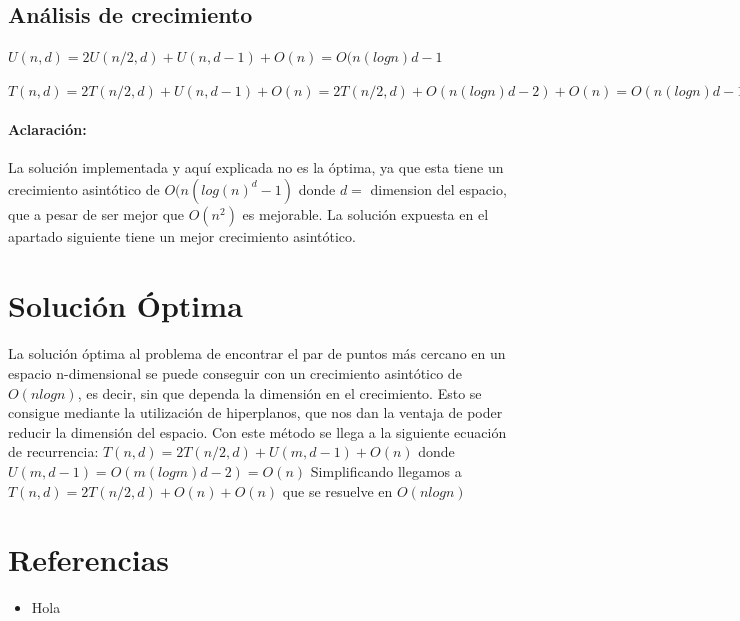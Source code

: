 \documentclass{article}
\begin{document}
	\subsection{Análisis de crecimiento}
	
	$U (n, d) = 2U (n/2, d) + U (n, d - 1) + O(n) = O(n(log n)d -1 $
	
	$T(n,d) = 2T(n/2,d) + U(n,d - 1) + O(n) = 2T (n/2, d) + O(n(log n)d-2) + O(n) = O(n(log n)d -1)$

	\paragraph{Aclaración:}
	La solución implementada y aquí explicada no es la óptima, ya que esta tiene un crecimiento asintótico de $O(n(log(n)^d-1)$ donde $d = $ dimension del espacio, que a pesar de ser mejor que $O(n^2)$ es mejorable. La solución expuesta en el apartado siguiente tiene un mejor crecimiento asintótico.
		
\section{Solución Óptima}
	\paragraph{}
	La solución óptima al problema de encontrar el par de puntos más cercano en un espacio n-dimensional se puede conseguir con un crecimiento asintótico de $O(nlogn)$, es decir, sin que dependa la dimensión en el crecimiento. Esto se consigue mediante la utilización de hiperplanos, que nos dan la ventaja de poder reducir la dimensión del espacio. Con este método se llega a la siguiente ecuación de recurrencia:
	$T(n, d) = 2T(n/2, d) + U(m, d - 1) + O(n)$ donde $U(m, d-1)=O(m (logm) d - 2) = O(n)$
	Simplificando llegamos a $T(n,d)=2T(n/2,d)+O(n)+O(n)$ que se resuelve en $O(nlogn)$ 

\section{Referencias}

	\begin{itemize}
		\item
		Hola				
	\end{itemize}
\end{document}
